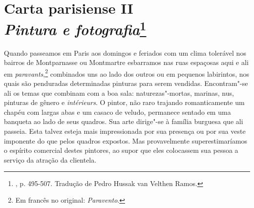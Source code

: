 \chapter{Carta parisiense II\\
\emph{Pintura e fotografia}\footnote[*]{
  , p. 495-507. Tradução de Pedro Hussak van Velthen Ramos.}}


Quando passeamos em Paris aos domingos e feriados com um clima tolerável
nos bairros de Montparnasse ou Montmartre esbarramos nas ruas espaçosas
aqui e ali em \emph{paravants},\footnote{Em francês no original:
  \emph{Paravento}. \versal{[N. T.]}} combinados uns ao lado dos outros ou em pequenos
labirintos, nos quais são penduradas determinadas pinturas para serem
vendidas. Encontram"-se ali os temas que combinam com a boa sala:
naturezas"-mortas, marinas, nus, pinturas de gênero e \emph{intérieurs}.
O pintor, não raro trajando romanticamente um chapéu com largas abas e
um casaco de veludo, permanece sentado em uma banqueta ao lado de seus
quadros. Sua arte dirige"-se à família burguesa que ali passeia. Esta
talvez esteja mais impressionada por sua presença ou por sua veste
imponente do que pelos quadros expostos. Mas provavelmente
superestimaríamos o espírito comercial destes pintores, ao supor que
eles colocassem sua pessoa a serviço da atração da clientela.

